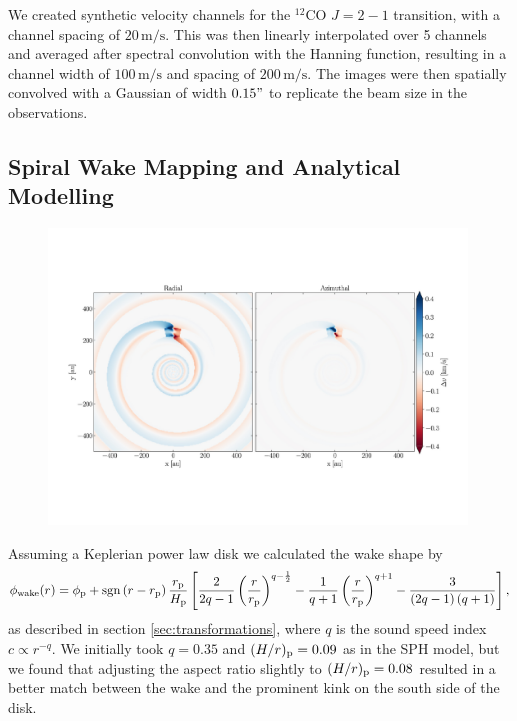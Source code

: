 We created synthetic velocity channels for the $^{12}$CO $J=2-1$ transition, with a channel spacing of $20 \, \mathrm{m/s}$.
This was then linearly interpolated over 5 channels and averaged after spectral convolution with the Hanning function, resulting in a channel width of $100 \, \mathrm{m/s}$ and spacing of $200 \, \mathrm{m/s}$.
The images were then spatially convolved with a Gaussian of width $0.15"$ to replicate the beam size in the observations.


\subsection{Spiral Wake Mapping and Analytical Modelling}

\begin{figure}
    \centering
    \includegraphics[width = 0.99\textwidth]{figures/calcino_analytics.pdf}
    \caption{}
    \label{fig:calcino_analytics}
\end{figure}

Assuming a Keplerian power law disk we calculated the wake shape by \citep{rafikov2002a}
\begin{align}
    \phi_{\rm wake}(r) = \phi_{\rm p} + {\rm sgn} \left( r - r_{\rm p} \right) \frac{r_{\rm p}}{H_{\rm p}} \left[ \frac{2}{2q-1} \left(\frac{r}{r_{\rm p}}\right)^{q-\frac{1}{2}} - \frac{1}{q+1} \left(\frac{r}{r_{\rm p}}\right)^{q+1} - \frac{3}{\left(2q-1\right)\left(q+1\right)} \right], \label{eq:power_law_wake}
\end{align}
as described in section \ref{sec:transformations}, where $q$ is the sound speed index $c \propto r^{-q}$.
We initially took $q=0.35$ and $(H/r)_{\rm p}=0.09$ as in the SPH model, but we found that adjusting the aspect ratio slightly to $(H/r)_{\rm p}=0.08$ resulted in a better match between the wake and the prominent kink on the south side of the disk.


